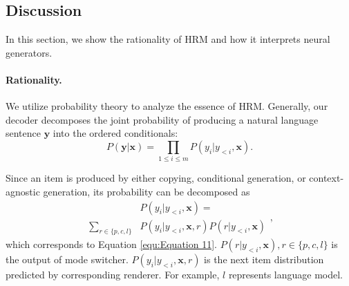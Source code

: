 \documentclass[letterpaper]{article} %
\begin{document}
	\subsection{Discussion}
	\label{sec:Discussion}

	In this section, we show the rationality of HRM and how it interprets neural generators.

	\paragraph{Rationality.} We utilize probability theory to analyze the essence of HRM. Generally, our decoder decomposes the joint probability of producing a natural language sentence $\mathbf{y}$ into the ordered conditionals:
	\begin{equation}
	P(\mathbf{y} | \mathbf{x}) = \prod_{1 \le i \le m} P(y_i | y_{<i}, \mathbf{x}).
	\end{equation}

	Since an item is produced by either copying, conditional generation, or context-agnostic generation, its probability can be decomposed as
	\begin{equation}
	\label{equ:Equation 17}
	\begin{aligned}
	& P(y_i | y_{<i}, \mathbf{x})  = \\
	\sum_{r \in \{p, c, l\}} & P(y_i | y_{<i}, \mathbf{x}, r) P(r | y_{<i}, \mathbf{x})
	\end{aligned},
	\end{equation}
	which corresponds to Equation \ref{equ:Equation 11}. $P(r | y_{<i}, \mathbf{x}), r \in \{p, c, l\}$ is the output of mode switcher. $P(y_i | y_{<i}, \mathbf{x}, r)$ is the next item distribution predicted by corresponding renderer. For example, $l$ represents language model.
\end{document}
